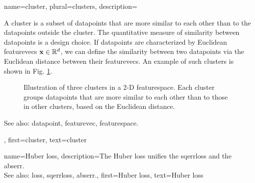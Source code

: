 {name={cluster}, plural={clusters}, 
	description={A cluster is a subset of 
		\glspl{datapoint} that are more similar to each other than to the \glspl{datapoint} outside the cluster. 
		The quantitative measure of similarity between \glspl{datapoint} is a design choice. If \glspl{datapoint} 
		are characterized by Euclidean \glspl{featurevec} ${\bf x} \in \mathbb{R}^{d}$, 
		we can define the similarity between two \glspl{datapoint} via the Euclidean distance between 
		their \glspl{featurevec}. An example of such clusters is shown in Fig. \ref{fig:clusters_dict}.\\
		\begin{figure}[H]
		\centering
		\caption{Illustration of three clusters in a 2-D \gls{featurespace}. Each cluster groups \glspl{datapoint} 
		that are more similar to each other than to those in other clusters, based on the Euclidean distance.}
		\label{fig:clusters_dict}
		\end{figure}
		See also: \gls{datapoint}, \gls{featurevec}, \gls{featurespace}.},
	first={cluster},
	text={cluster} 
}


{name={Huber loss}, 
	description={The 
		Huber \gls{loss} unifies the \gls{sqerrloss} and the \gls{abserr}.
				\\
		See also: \gls{loss}, \gls{sqerrloss}, \gls{abserr}.},
	first={Huber loss},
	text={Huber loss} 
}


